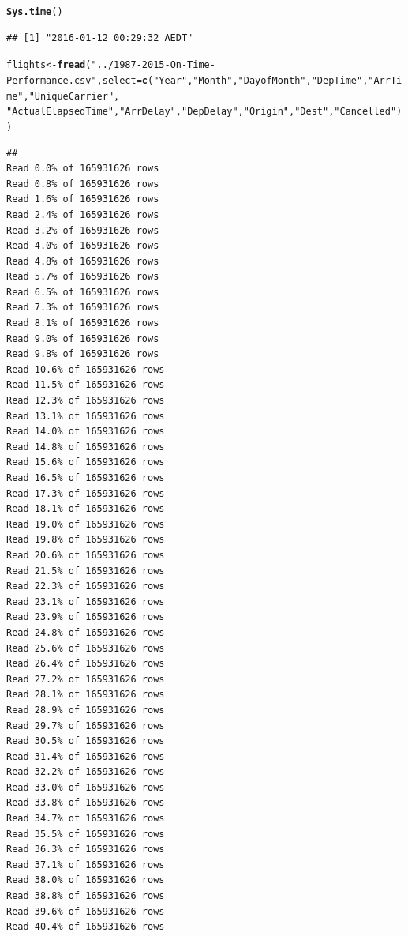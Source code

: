 \documentclass{scrreprt}\usepackage[]{graphicx}\usepackage[]{color}
\makeatletter
\newcommand{\hlstr}[1]{\textcolor[rgb]{0.192,0.494,0.8}{#1}}%
\newcommand{\hlstd}[1]{\textcolor[rgb]{0.345,0.345,0.345}{#1}}%
\newcommand{\hlkwb}[1]{\textcolor[rgb]{0.69,0.353,0.396}{#1}}%
\newcommand{\hlkwc}[1]{\textcolor[rgb]{0.333,0.667,0.333}{#1}}%
\newcommand{\hlkwd}[1]{\textcolor[rgb]{0.737,0.353,0.396}{\textbf{#1}}}%
\newenvironment{kframe}{%
 \def\at@end@of@kframe{}%
 \ifinner\ifhmode%
  \def\at@end@of@kframe{\end{minipage}}%
  \begin{minipage}{\columnwidth}%
 \fi\fi%
 \def\FrameCommand##1{\hskip\@totalleftmargin \hskip-\fboxsep
 \colorbox{shadecolor}{##1}\hskip-\fboxsep
     \hskip-\linewidth \hskip-\@totalleftmargin \hskip\columnwidth}%
 \MakeFramed {\advance\hsize-\width
   \@totalleftmargin\z@ \linewidth\hsize
   \@setminipage}}%
 {\par\unskip\endMakeFramed%
 \at@end@of@kframe}
\newenvironment{knitrout}{}{} %
\makeatother
\begin{document}
\begin{knitrout}
\color{fgcolor}\begin{kframe}
\begin{alltt}
\hlkwd{Sys.time}\hlstd{()}
\end{alltt}
\begin{verbatim}
## [1] "2016-01-12 00:29:32 AEDT"
\end{verbatim}
\begin{alltt}
\hlstd{flights} \hlkwb{<-} \hlkwd{fread}\hlstd{(}\hlstr{"../1987-2015-On-Time-Performance.csv"}\hlstd{,} \hlkwc{select} \hlstd{=} \hlkwd{c}\hlstd{(}\hlstr{"Year"}\hlstd{,} \hlstr{"Month"}\hlstd{,} \hlstr{"DayofMonth"}\hlstd{,} \hlstr{"DepTime"}\hlstd{,} \hlstr{"ArrTime"}\hlstd{,} \hlstr{"UniqueCarrier"}\hlstd{,}
                                                                    \hlstr{"ActualElapsedTime"}\hlstd{,} \hlstr{"ArrDelay"}\hlstd{,} \hlstr{"DepDelay"}\hlstd{,} \hlstr{"Origin"}\hlstd{,} \hlstr{"Dest"}\hlstd{,} \hlstr{"Cancelled"}\hlstd{))}
\end{alltt}
\begin{verbatim}
## 
Read 0.0% of 165931626 rows
Read 0.8% of 165931626 rows
Read 1.6% of 165931626 rows
Read 2.4% of 165931626 rows
Read 3.2% of 165931626 rows
Read 4.0% of 165931626 rows
Read 4.8% of 165931626 rows
Read 5.7% of 165931626 rows
Read 6.5% of 165931626 rows
Read 7.3% of 165931626 rows
Read 8.1% of 165931626 rows
Read 9.0% of 165931626 rows
Read 9.8% of 165931626 rows
Read 10.6% of 165931626 rows
Read 11.5% of 165931626 rows
Read 12.3% of 165931626 rows
Read 13.1% of 165931626 rows
Read 14.0% of 165931626 rows
Read 14.8% of 165931626 rows
Read 15.6% of 165931626 rows
Read 16.5% of 165931626 rows
Read 17.3% of 165931626 rows
Read 18.1% of 165931626 rows
Read 19.0% of 165931626 rows
Read 19.8% of 165931626 rows
Read 20.6% of 165931626 rows
Read 21.5% of 165931626 rows
Read 22.3% of 165931626 rows
Read 23.1% of 165931626 rows
Read 23.9% of 165931626 rows
Read 24.8% of 165931626 rows
Read 25.6% of 165931626 rows
Read 26.4% of 165931626 rows
Read 27.2% of 165931626 rows
Read 28.1% of 165931626 rows
Read 28.9% of 165931626 rows
Read 29.7% of 165931626 rows
Read 30.5% of 165931626 rows
Read 31.4% of 165931626 rows
Read 32.2% of 165931626 rows
Read 33.0% of 165931626 rows
Read 33.8% of 165931626 rows
Read 34.7% of 165931626 rows
Read 35.5% of 165931626 rows
Read 36.3% of 165931626 rows
Read 37.1% of 165931626 rows
Read 38.0% of 165931626 rows
Read 38.8% of 165931626 rows
Read 39.6% of 165931626 rows
Read 40.4% of 165931626 rows

\end{verbatim}
\end{kframe}
\end{knitrout}
\end{document}
